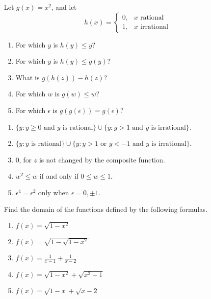\begin{pr} \label{pr3.2}
  Let $g(x) = x^2$, and let
  \begin{equation*}
    h(x) = \left\{
    \begin{array}{rl}
      0, & x \text{ rational} \\
      1, & x \text{ irrational}
    \end{array}
    \right.
  \end{equation*}
  \begin{enumerate}[label = (\roman*)]
    \item For which $y$ is $h(y) \leq y$?
    \item For which $y$ is $h(y) \leq g(y)$?
    \item What is $g(h(z)) - h(z)$?
    \item For which $w$ is $g(w) \leq w$?
    \item For which $\epsilon$ is $g(g(\epsilon)) = g(\epsilon)$?
  \end{enumerate}
\end{pr}

\begin{solution}
  \begin{enumerate}[label = (\roman*)]
    \item $\{ y: y\geq0 \text{ and } y \text{ is rational} \} \cup
    \{ y: y > 1 \text{ and } y \text{ is irrational} \}$.
    \item $ \{y: y \text{ is rational} \} \cup
    \{ y: y > 1 \text{ or } y < -1 \text{ and } y \text{ is irrational} \} $.
    \item $0$, for $z$ is not changed by the composite function.
    \item $w^2 \leq w$ if and only if $0 \leq w \leq 1$.
    \item $\epsilon^4 = \epsilon^2$ only when $\epsilon = 0,\pm1$.
  \end{enumerate}
\end{solution}

\begin{pr} \label{pr3.3}
  Find the domain of the functions defined by the following formulas.
  \begin{enumerate}[label=(\roman*)]
    \item $f(x) = \sqrt{1 - x^2}$
    \item $f(x) = \sqrt{1 - \sqrt{1 - x^2}}$
    \item $f(x) = \displaystyle\frac{1}{x - 1} + \displaystyle\frac{1}{x - 2}$
    \item $f(x) = \sqrt{1 - x^2} + \sqrt{x^2 - 1}$
    \item $f(x) = \sqrt{1 - x} + \sqrt{x - 2}$
  \end{enumerate}
\end{pr}

